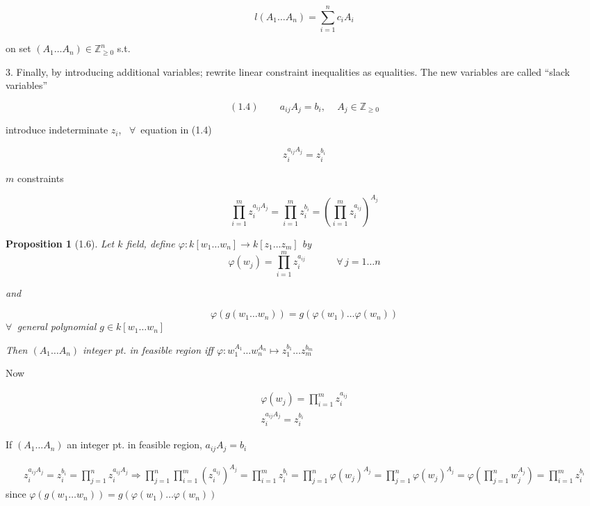 \documentclass[10pt]{amsart}
\newtheorem{proposition}{Proposition}
\newcommand{\exercisehead}[1]
  { \smallskip
   \noindent{\small\bf Exercise #1.}
  }
\begin{document}
\begin{multicols*}{2}
\[
l(A_1 \dots A_n) = \sum_{i=1}^n c_i A_i 
\]

on set $(A_1 \dots A_n) \in \mathbb{Z}^n_{ \geq 0}$ s.t. 


3. Finally, by introducing additional variables; rewrite linear constraint inequalities as equalities. The new variables are called ``slack variables''

\begin{equation}
(1.4) \quad \quad \, a_{ij} A_j = b_i, \quad \, A_j \in \mathbb{Z}_{\geq 0}
\end{equation}

introduce indeterminate $z_i$, \, $\forall \, $ equation in (1.4)

\[
z_i^{a_{ij} A_j} = z_i^{b_i}
\]

$m$ constraints

\[
\prod_{i=1}^m z_i^{a_{ij}A_j} = \prod_{i=1}^m z_i^{b_i} = \left( \prod_{i=1}^m z_i^{a_{ij}} \right)^{ A_j}
\]

\begin{proposition}[1.6]
  Let $k$ field, define $\varphi: k[w_1 \dots w_n] \to k[z_1 \dots z_m]$ by 
\[
\varphi(w_j) = \prod_{i=1}^m z_i^{a_{ij}} \quad \quad \quad \, \forall \, j = 1 \dots n 
\]

and 

\[
\varphi(g(w_1 \dots w_n) ) = g(\varphi(w_1) \dots \varphi(w_n))
\]
$\forall \, $ general polynomial $g\in k[w_1 \dots w_n]$

Then $(A_1 \dots A_n)$ integer pt. in feasible region iff $\varphi: w_1^{A_1} \dots w_n^{A_n} \mapsto z_1^{b_1} \dots z_m^{b_m}$



\end{proposition}

\exercisehead{3}

Now 

\[
\begin{gathered}
\varphi(w_j) = \prod_{i=1}^m z_i^{a_{ij}} \\
z_i^{a_{ij} A_j} = z_i^{b_i}
\end{gathered}
\]

If $(A_1 \dots A_n)$ an integer pt. in feasible region, $a_{ij} A_j = b_i$

\[
\begin{gathered}
z_i^{a_{ij}A_j } = z_i^{b_i} = \prod_{j=1}^n z_i^{a_{ij} A_j} \Longrightarrow \prod_{j=1}^n \prod_{i=1}^m (z_i^{a_{ij} })^{A_j} = \prod_{i=1}^m z_i^{b_i} = \prod_{j=1}^n \varphi(w_j)^{ A_j} = \prod_{j=1}^n \varphi(w_j)^{A_j} = \varphi\left( \prod_{j=1}^n w_j^{ A_j } \right) = \prod_{i=1}^m z_i^{b_i}
\end{gathered}
\]
since $\varphi(g(w_1 \dots w_n)) = g(\varphi(w_1) \dots \varphi(w_n))$ \\


\end{multicols*}
\end{document}
